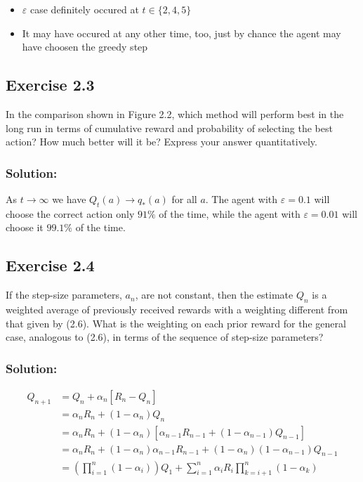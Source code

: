 \begin{itemize}
    \item $\varepsilon$ case definitely occured at $t \in \{2,4,5\}$
    \item It may have occured at any other time, too, just by chance the agent may have choosen the greedy step
\end{itemize} 

\subsection*{Exercise 2.3} 
In the comparison shown in Figure 2.2, which method will perform best in
the long run in terms of cumulative reward and probability of selecting the best action?
How much better will it be? Express your answer quantitatively.

\subsubsection*{Solution:}
As $t \to \infty$ we have $Q_t(a) \to q_*(a)$ for all $a$. The agent with $\varepsilon=0.1$ will choose the correct action only $91\%$ of the time, while the agent with $\varepsilon=0.01$ will choose it $99.1\%$ of the time.

\subsection*{Exercise 2.4} 
If the step-size parameters, $a_n$, are not constant, then the estimate $Q_n$ is
a weighted average of previously received rewards with a weighting different from that
given by (2.6). What is the weighting on each prior reward for the general case, analogous
to (2.6), in terms of the sequence of step-size parameters?

\subsubsection*{Solution:}


\begin{align*}
    Q_{n+1} &= Q_n + \alpha_n \left[ R_n - Q_n \right] \\
    &= \alpha_n  R_n + (1-\alpha_n) Q_n \\
    &= \alpha_n  R_n + (1-\alpha_n) \left[ \alpha_{n-1}  R_{n-1} + (1-\alpha_{n-1}) Q_{n-1} \right] \\
    &= \alpha_n  R_n + (1-\alpha_n) \alpha_{n-1}  R_{n-1} + (1-\alpha_n) (1-\alpha_{n-1}) Q_{n-1} \\
    &= \left( \prod_{i=1}^{n} (1-\alpha_i) \right) Q_1 + \sum_{i=1}^{n} \alpha_i R_i \prod_{k=i+1}^{n} (1-\alpha_k) 
\end{align*}

